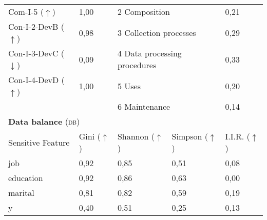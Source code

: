\begin{table}[h]
\begin{tabular}{|p{3cm}|p{1.9cm}p{3cm}p{2.6cm}p{1.6cm}|}
        Com-I-5 ($\uparrow$) & 1,00\cellcolor[HTML]{FFFFFF} & \multicolumn{2}{|l|}{2 Composition} & 0,21\cellcolor[HTML]{FCA990} \\
        Con-I-2-DevB ($\uparrow$) & 0,98\cellcolor[HTML]{FEFCFC} & \multicolumn{2}{|l|}{3 Collection processes} & 0,29\cellcolor[HTML]{FCB19A} \\
        Con-I-3-DevC ($\downarrow$) & 0,09\cellcolor[HTML]{FEF5F2} & \multicolumn{2}{|l|}{4 Data processing procedures} & 0,33\cellcolor[HTML]{FDB6A0} \\
        Con-I-4-DevD ($\uparrow$) & 1,00\cellcolor[HTML]{FFFFFF} & \multicolumn{2}{|l|}{5 Uses} & 0,20\cellcolor[HTML]{FCA78E} \\ 
         & & \multicolumn{2}{|l|}{6 Maintenance} & 0,14\cellcolor[HTML]{FCA186} \\ \hline
        \multicolumn{5}{|l|}{\textbf{Data balance} (\textsc{db})} \\ \hline 
 		Sensitive Feature & Gini ($\uparrow$) & Shannon ($\uparrow$) & Simpson ($\uparrow$) & I.I.R. ($\uparrow$) \\ \hline
        job & 0,92 & 0,85 & 0,51 & 0,08\cellcolor[HTML]{fc8d59} \\
		education & 0,92 & 0,86 & 0,63 & 0,00\cellcolor[HTML]{fc8d59} \\
		marital & 0,81 & 0,82 & 0,59 & 0,19 \\
		y & 0,40 & 0,51 & 0,25\cellcolor[HTML]{fc8d59} & 0,13\cellcolor[HTML]{fc8d59} \\
		 \hline
    \end{tabular}
\end{table}